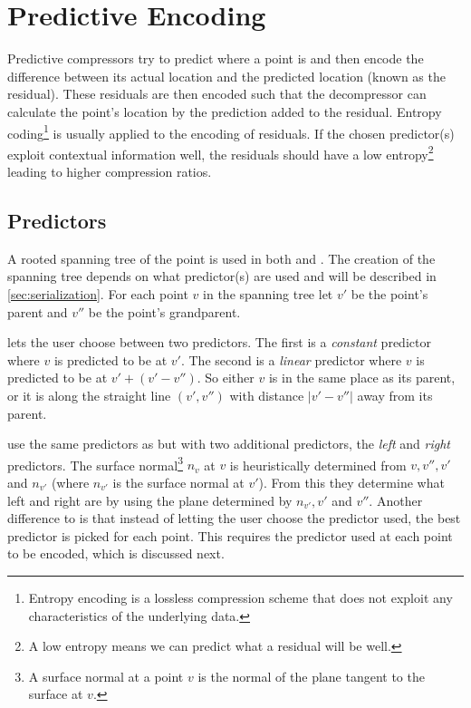 \documentclass{report}
\begin{document}
\section{Predictive Encoding}

Predictive compressors try to predict where a point is and then encode the
difference between its actual location and the predicted location (known as
the residual). These residuals are then encoded such that the decompressor can
calculate the point's location by the prediction added to the
residual. Entropy coding\footnote{Entropy encoding is a lossless compression
  scheme that does not exploit any characteristics of the underlying data.} is
usually applied to the encoding of residuals. If the chosen predictor(s)
exploit contextual information well, the residuals should have a low
entropy\footnote{A low entropy means we can predict what a residual will be
  well.}  leading to higher compression ratios.


\subsection{Predictors}

A rooted spanning tree of the point is used in both \citep{gumholdcomp} and
\citep{merrycomp}. The creation of the spanning tree depends on what
predictor(s) are used and will be described in \ref{sec:serialization}. For
each point $v$ in the spanning tree let $v'$ be the point's parent and $v''$
be the point's grandparent.

\citet{gumholdcomp} lets the user choose between two predictors. The first is
a \emph{constant} predictor where $v$ is predicted to be at $v'$. The second
is a \emph{linear} predictor where $v$ is predicted to be at $v' + (v' -
v'')$. So either $v$ is in the same place as its parent, or it is along the
straight line $(v', v'')$ with distance $|v'-v''|$ away from its parent.

\citet{merrycomp} use the same predictors as \citep{gumholdcomp} but with two
additional predictors, the \emph{left} and \emph{right} predictors. The
surface normal\footnote{A surface normal at a point $v$ is the normal of the
  plane tangent to the surface at $v$.} $n_v$ at $v$ is heuristically
determined from $v, v'', v'$ and $n_{v'}$ (where $n_{v'}$ is the surface
normal at $v'$). From this they determine what left and right are by using the
plane determined by $n_{v'}, v'$ and $v''$. Another difference to
\citeauthor{gumholdcomp} is that instead of letting the user choose the
predictor used, the best predictor is picked for each point. This requires the
predictor used at each point to be encoded, which is discussed next.
\end{document}
